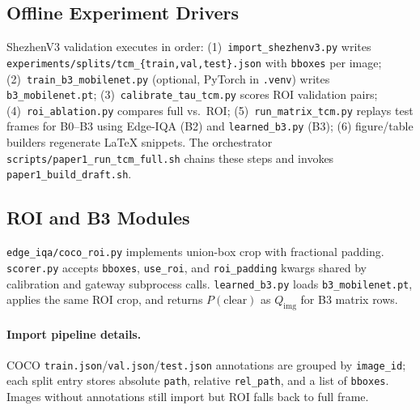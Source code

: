 \begin{table}[t]
\centering
\caption{Selected environment variables (\texttt{franka\_api\_server}).}
\label{tab:env-vars}
\small
{}
\end{table}

\subsection{Offline Experiment Drivers}
ShezhenV3 validation executes in order: (1)~\texttt{import\_shezhenv3.py} writes \texttt{experiments/splits/tcm\_\{train,val,test\}.json} with \texttt{bboxes} per image; (2)~\texttt{train\_b3\_mobilenet.py} (optional, PyTorch in \texttt{.venv}) writes \texttt{b3\_mobilenet.pt}; (3)~\texttt{calibrate\_tau\_tcm.py} scores ROI validation pairs; (4)~\texttt{roi\_ablation.py} compares full vs.\ ROI; (5)~\texttt{run\_matrix\_tcm.py} replays test frames for B0--B3 using Edge-IQA (B2) and \texttt{learned\_b3.py} (B3); (6) figure/table builders regenerate \LaTeX{} snippets.
The orchestrator \texttt{scripts/paper1\_run\_tcm\_full.sh} chains these steps and invokes \texttt{paper1\_build\_draft.sh}.

\subsection{ROI and B3 Modules}
\texttt{edge\_iqa/coco\_roi.py} implements union-box crop with fractional padding.
\texttt{scorer.py} accepts \texttt{bboxes}, \texttt{use\_roi}, and \texttt{roi\_padding} kwargs shared by calibration and gateway subprocess calls.
\texttt{learned\_b3.py} loads \texttt{b3\_mobilenet.pt}, applies the same ROI crop, and returns $P(\mathrm{clear})$ as $Q_{\mathrm{img}}$ for B3 matrix rows.

\paragraph{Import pipeline details.}
COCO \texttt{train.json}/\texttt{val.json}/\texttt{test.json} annotations are grouped by \texttt{image\_id}; each split entry stores absolute \texttt{path}, relative \texttt{rel\_path}, and a list of \texttt{bboxes}.
Images without annotations still import but ROI falls back to full frame.

